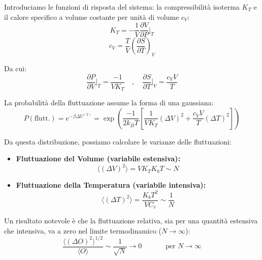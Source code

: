 Introduciamo le funzioni di risposta del sistema: la compressibilità isoterma $K_T$ e il calore specifico a volume costante per unità di volume $c_V$:
\begin{equation}
    K_{T}=-\frac{1}{V}\frac{\partial V}{\partial P}\bigg|_{T}
    \label{eq:def_KT}
\end{equation}
\begin{equation}
    c_{V}=\frac{T}{V}\left(\frac{\partial S}{\partial T}\right)_V
    \label{eq:def_cV}
\end{equation}

Da cui:
\begin{equation}
    \frac{\partial P}{\partial V}\bigg|_{T}=\frac{-1}{VK_{T}} \quad , \quad \frac{\partial S}{\partial T}\bigg|_{V}=\frac{c_{V} V}{T}
    \label{eq:derivate_risposta}
\end{equation}

La probabilità della fluttuazione assume la forma di una gaussiana:
\begin{equation}
    P(\text{flutt.})=e^{-\beta\Delta U^{(2)}}=\exp\left(\frac{-1}{2k_{B}T}\left[\frac{1}{VK_{T}}(\Delta V)^{2}+\frac{c_{V} V}{T}(\Delta T)^{2}\right]\right)
    \label{eq:prob_gaussiana}
\end{equation}

Da questa distribuzione, possiamo calcolare le varianze delle fluttuazioni:
\begin{itemize}
    \item \textbf{Fluttuazione del Volume (variabile estensiva):}
    \begin{equation}
        \langle(\Delta V)^{2}\rangle=VK_{T}K_{b}T\sim N
        \label{eq:varianza_V}
    \end{equation}
    \item \textbf{Fluttuazione della Temperatura (variabile intensiva):}
    \begin{equation}
        \langle(\Delta T)^{2}\rangle=\frac{K_{b}T^{2}}{VC_v}\sim\frac{1}{N}
        \label{eq:varianza_T}
    \end{equation}
\end{itemize}

Un risultato notevole è che la fluttuazione relativa, sia per una quantità estensiva che intensiva, va a zero nel limite termodinamico ($N \rightarrow \infty$):
\begin{equation}
    \frac{\langle(\Delta O)^{2}\rangle^{1/2}}{\langle O\rangle} \sim \frac{1}{\sqrt{N}}\longrightarrow0 \quad \quad \quad\text{ per } N\rightarrow\infty
    \label{eq:fluttuazione_relativa}
\end{equation}

